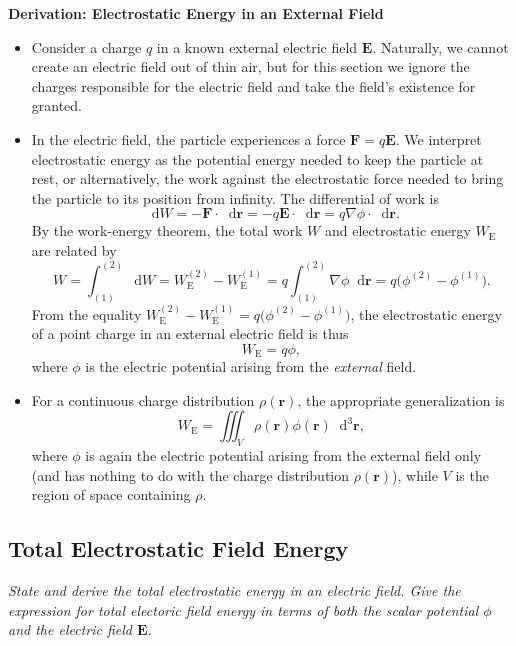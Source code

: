 \documentclass[11pt, a4paper]{article}
\newcommand{\diff}{\mathop{}\!\mathrm{d}} %
\newcommand{\dr}{\diff^{3} \r}  %
\renewcommand{\vec}[1]{\bm{#1}} %
\renewcommand{\r}{\vec{r}}
\newcommand{\E}{\vec{E}} %
\renewcommand{\grad}{\nabla}
\begin{document}
\textbf{Derivation: Electrostatic Energy in an External Field}
\begin{itemize}
	\item Consider a charge $ q $ in a known external electric field $ \E $. Naturally, we cannot create an electric field out of thin air, but for this section we ignore the charges responsible for the electric field and take the field's existence for granted.
	
	\item In the electric field, the particle experiences a force $ \vec{F} = q \E $. We interpret electrostatic energy as the potential energy needed to keep the particle at rest, or alternatively, the work against the electrostatic force needed to bring the particle to its position from infinity. The differential of work is
	\begin{equation*}
		\diff W = - \vec{F} \cdot \diff \r = - q \E \cdot  \diff \r = q \grad \phi \cdot \diff \r.
	\end{equation*}
	By the work-energy theorem, the total work $ W $ and electrostatic energy $ W_{\text{E}} $ are related by
	 \begin{equation*}
		W = \int_{(1)}^{(2)} \diff W = W_{\text{E}}^{(2)} - W_{\text{E}}^{(1)} = q \int_{(1)}^{(2)}\grad \phi \diff \r = q\big(\phi^{(2) }- \phi^{(1)}\big).
	\end{equation*}
	From the equality $ W_{\text{E}}^{(2)} - W_{\text{E}}^{(1)} = q\big(\phi^{(2) }- \phi^{(1)}\big) $, the electrostatic energy of a point charge in an external electric field is thus
	\begin{equation*}
		W_{\text{E}} = q \phi,
	\end{equation*}
	where $ \phi $ is the electric potential arising from the \textit{external} field. 
	
	\item For a continuous charge distribution $ \rho(\r) $, the appropriate generalization is
	\begin{equation*}
		W_{\text{E}} = \iiint_{V} \rho(\r) \phi (\r) \dr,
	\end{equation*}
	where $ \phi $ is again the electric potential arising from the external field only (and has nothing to do with the charge distribution $ \rho(\r) $), while $ V $ is the region of space containing $ \rho $.
\end{itemize}

    
\subsection{Total Electrostatic Field Energy} \label{ss:total-E-energy}
\textit{State and derive the total electrostatic energy in an electric field. Give the expression for total electoric field energy in terms of both the scalar potential $ \phi $ and the electric field $ \E $.}
\end{document}
